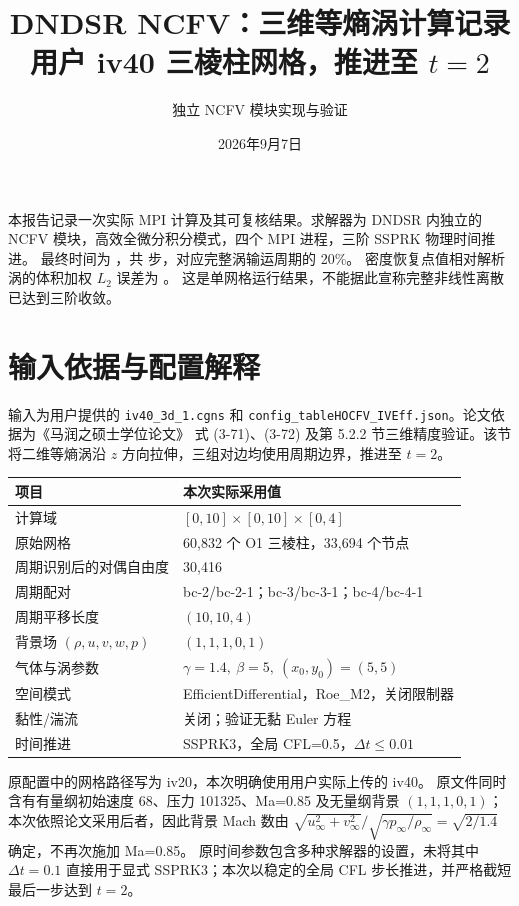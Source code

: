 \documentclass[UTF8,fontset=none,11pt,a4paper]{ctexart}
\title{DNDSR NCFV：三维等熵涡计算记录\\\large 用户 iv40 三棱柱网格，推进至 $t=2$}
\author{独立 NCFV 模块实现与验证}
\date{2026年9月7日}
\begin{document}
\maketitle

本报告记录一次实际 MPI 计算及其可复核结果。求解器为 DNDSR 内独立的
NCFV 模块，高效全微分积分模式，四个 MPI 进程，三阶 SSPRK 物理时间推进。
最终时间为 \RunTime，共 \RunSteps{} 步，对应完整涡输运周期的 20\%。
密度恢复点值相对解析涡的体积加权 $L_2$ 误差为 \texttt{\RunLtwo}。
这是单网格运行结果，不能据此宣称完整非线性离散已达到三阶收敛。

\section{输入依据与配置解释}
输入为用户提供的 \texttt{iv40\_3d\_1.cgns} 和
\texttt{config\_tableHOCFV\_IVEff.json}。论文依据为《马润之硕士学位论文》
式 (3-71)、(3-72) 及第 5.2.2 节三维精度验证。该节将二维等熵涡沿 $z$
方向拉伸，三组对边均使用周期边界，推进至 $t=2$。

\begin{center}
\begin{tabular}{ll}
\toprule
项目 & 本次实际采用值\\\midrule
计算域 & $[0,10]\times[0,10]\times[0,4]$\\
原始网格 & 60,832 个 O1 三棱柱，33,694 个节点\\
周期识别后的对偶自由度 & 30,416\\
周期配对 & bc-2/bc-2-1；bc-3/bc-3-1；bc-4/bc-4-1\\
周期平移长度 & $(10,10,4)$\\
背景场 $(\rho,u,v,w,p)$ & $(1,1,1,0,1)$\\
气体与涡参数 & $\gamma=1.4,\ \beta=5,\ (x_0,y_0)=(5,5)$\\
空间模式 & EfficientDifferential，Roe\_M2，关闭限制器\\
黏性/湍流 & 关闭；验证无黏 Euler 方程\\
时间推进 & SSPRK3，全局 CFL=0.5，$\Delta t\le0.01$\\
\bottomrule
\end{tabular}
\end{center}

原配置中的网格路径写为 iv20，本次明确使用用户实际上传的 iv40。
原文件同时含有有量纲初始速度 68、压力 101325、Ma=0.85 及无量纲背景
$(1,1,1,0,1)$；本次依照论文采用后者，因此背景 Mach 数由
$\sqrt{u_\infty^2+v_\infty^2}/\sqrt{\gamma p_\infty/\rho_\infty}
=\sqrt{2/1.4}$ 确定，不再次施加 Ma=0.85。
原时间参数包含多种求解器的设置，未将其中 $\Delta t=0.1$ 直接用于显式
SSPRK3；本次以稳定的全局 CFL 步长推进，并严格截短最后一步达到 $t=2$。
\end{document}
